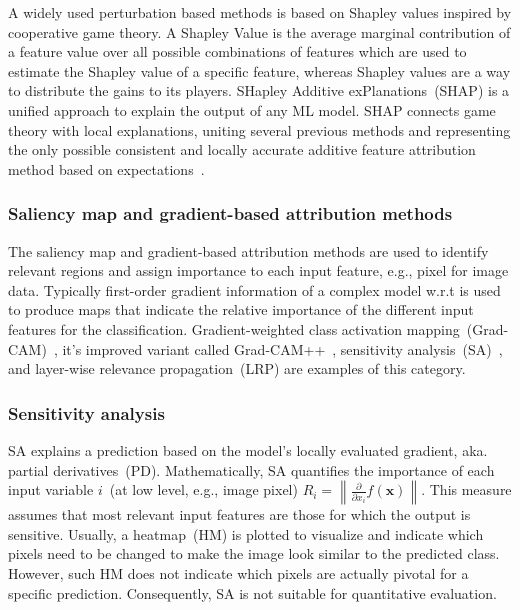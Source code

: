 \hspace*{3.5mm} A widely used perturbation based methods is based on Shapley values inspired by cooperative game theory. A Shapley Value is the average marginal contribution of a feature value over all possible combinations of features which are used to estimate the Shapley value of a specific feature, whereas Shapley values are a way to distribute the gains to its players. SHapley Additive exPlanations~(SHAP) is a unified approach to explain the output of any ML model. SHAP connects game theory with local explanations, uniting several previous methods and representing the only possible consistent and locally accurate additive feature attribution method based on expectations~\cite{NIPS2017_7062}. 

\subsubsection{Saliency map and gradient-based attribution methods}
The saliency map and gradient-based attribution methods are used to identify relevant regions and assign importance to each input feature, e.g., pixel for image data. Typically first-order gradient information of a complex model w.r.t is used to produce maps that indicate the relative importance of the different input features for the classification. Gradient-weighted class activation mapping~(Grad-CAM)~\cite{selvaraju2017grad}, it's improved variant called Grad-CAM++~\cite{chattopadhay2018grad}, sensitivity analysis~(SA)~\cite{baehrens2010explain, simonyan2013deep}, and layer-wise relevance propagation~(LRP) are examples of this category. 

\subsubsection{Sensitivity analysis}
SA explains a prediction based on the model's locally evaluated gradient, aka. partial derivatives~(PD). Mathematically, SA quantifies the importance of each input variable $i$~(at low level, e.g., image pixel) $R_{i}=\left\|\frac{\partial}{\partial x_{i}} f(\mathbf{x})\right\|$. This measure assumes that most relevant input features are those for which the output is sensitive. Usually, a heatmap~(HM) is plotted to visualize and indicate which pixels need to be changed to make the image look similar to the predicted class. However, such HM does not indicate which pixels are actually pivotal for a specific prediction. Consequently, SA is not suitable for quantitative evaluation. 

